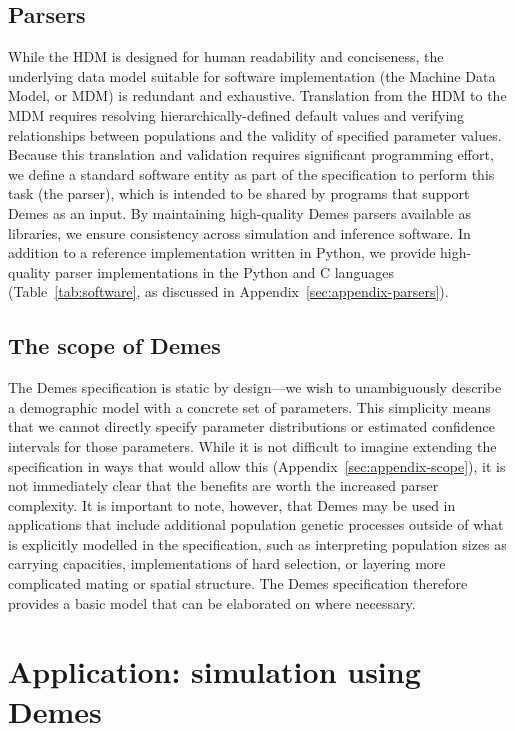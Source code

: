 \documentclass[11pt]{article}
\begin{document}
\subsection*{Parsers}

While the HDM is designed for human readability and
conciseness, the underlying data model suitable for software implementation
(the Machine Data Model, or MDM)
is redundant and exhaustive.
Translation from the HDM to the MDM
requires resolving hierarchically-defined default values and verifying
relationships between populations and the validity of specified parameter
values.
Because this translation and validation requires significant
programming effort, we define a standard software entity as part of the
specification to perform this task (the parser),
which is intended to be shared by programs that support Demes as an input.
By maintaining high-quality Demes parsers available as libraries,
we ensure consistency across simulation and inference
software.
In addition to a reference implementation written in Python,
we provide high-quality parser implementations in the Python and
C languages (Table~\ref{tab:software}, as discussed in
Appendix~\ref{sec:appendix-parsers}).

\subsection*{The scope of Demes}

The Demes specification is static by design---we wish to unambiguously
describe a demographic model with a concrete set of parameters.
This simplicity means that we cannot directly specify parameter distributions
or estimated confidence intervals for those parameters.
While it is not difficult to imagine extending the specification in ways that
would allow this (Appendix~\ref{sec:appendix-scope}), it is not immediately
clear that the benefits are worth the increased parser complexity.
It is important to note, however, that Demes may be used in applications that
include additional population genetic processes outside of what is explicitly
modelled in the specification, such as interpreting population sizes as
carrying capacities, implementations of hard selection, or layering more
complicated mating or spatial structure. The Demes specification therefore
provides a basic model that can be elaborated on where necessary.

\section*{Application: simulation using Demes}
\end{document}
